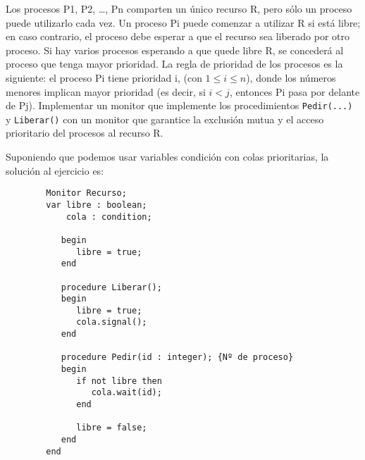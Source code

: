 \begin{ejercicio}
    Los procesos P1, P2, \ldots, Pn comparten un único recurso R, pero sólo un proceso puede utilizarlo cada vez. Un proceso Pi puede comenzar a utilizar R si está libre; en caso contrario, el proceso debe esperar a que el recurso sea liberado por otro proceso. Si hay varios procesos esperando a que quede libre R, se concederá al proceso que tenga mayor prioridad. La regla de prioridad de los procesos es la siguiente: el proceso Pi tiene prioridad i, (con $1 \leq i \leq n$), donde los números menores implican mayor prioridad (es decir, si $i < j$, entonces Pi pasa por delante de Pj). Implementar un monitor que implemente los procedimientos \verb|Pedir(...)| y \verb|Liberar()| con un monitor que garantice la exclusión mutua y el acceso prioritario del procesos al recurso R.

    Suponiendo que podemos usar variables condición con colas prioritarias, la solución al ejercicio es:
    \begin{verbatim}
        Monitor Recurso;
        var libre : boolean;
            cola : condition;

           begin
              libre = true;
           end

           procedure Liberar();
           begin
              libre = true;
              cola.signal();
           end

           procedure Pedir(id : integer); {Nº de proceso}
           begin
              if not libre then
                 cola.wait(id);
              end

              libre = false;
           end
        end
    \end{verbatim}
\end{ejercicio}

